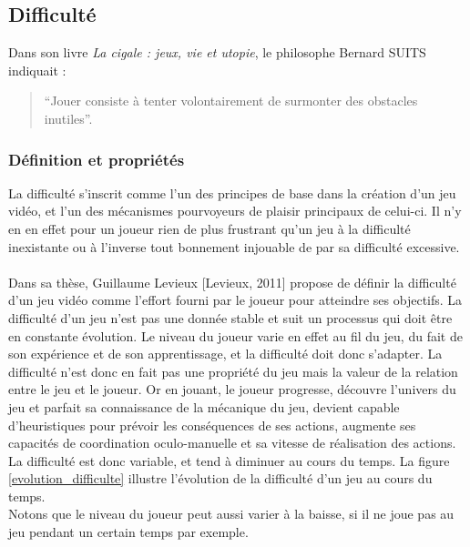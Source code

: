 \subsection{Difficulté}
Dans son livre \emph{La cigale : jeux, vie et utopie}, le philosophe Bernard SUITS indiquait : \begin{quote}{“Jouer consiste à tenter volontairement de surmonter des obstacles inutiles”}.  \end{quote}
		
	\subsubsection{Définition et propriétés}
La difficulté s’inscrit comme l’un des principes de base dans la création d’un jeu vidéo, et l’un des mécanismes pourvoyeurs de plaisir principaux de celui-ci. Il n’y en en effet pour un joueur rien de plus frustrant qu’un jeu à la difficulté inexistante ou à l’inverse tout bonnement injouable de par sa difficulté excessive. \paragraph{}

Dans sa thèse, Guillaume Levieux [Levieux, 2011]\cite{Levi11} propose de définir la difficulté d’un jeu vidéo comme l’effort fourni par le joueur pour atteindre ses objectifs. La difficulté d’un jeu n’est pas une donnée stable et suit un processus qui doit être en constante évolution. Le niveau du joueur varie en effet au fil du jeu, du fait de son expérience et de son apprentissage, et la difficulté doit donc s’adapter. 
La difficulté n’est donc en fait pas une propriété du jeu mais la valeur de la relation entre le jeu et le joueur. Or en jouant, le joueur progresse, découvre l’univers du jeu et parfait sa connaissance de la mécanique du jeu, devient capable d’heuristiques pour prévoir les conséquences de ses actions, augmente ses capacités de coordination oculo-manuelle et sa vitesse de réalisation des actions. La difficulté est donc variable, et tend à diminuer au cours du temps. La figure \ref{evolution_difficulte} illustre l'évolution de la difficulté d'un jeu au cours du temps.\\
Notons que le niveau du joueur peut aussi varier à la baisse, si il ne joue pas au jeu pendant un certain temps par exemple.

